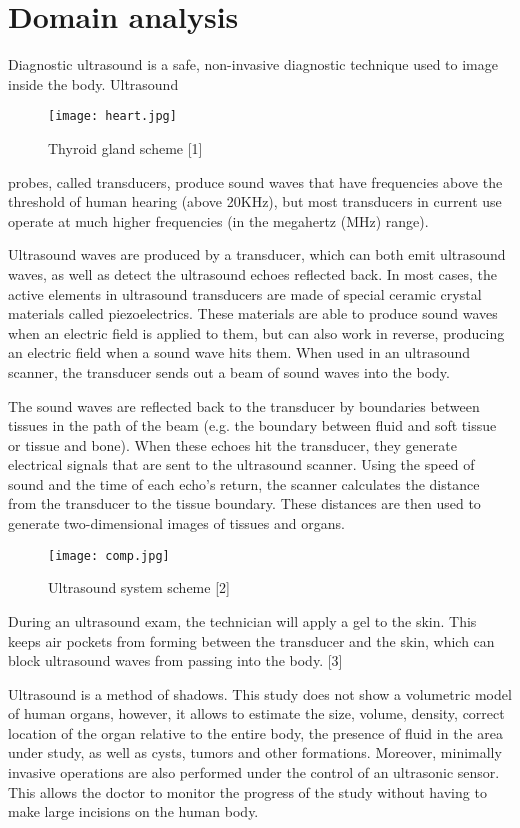 \documentclass[10pt, twocolumn, a4paper]{article}
\begin{document}
\section{Domain analysis}
Diagnostic ultrasound is a safe, non-invasive diagnostic technique used to image inside the body. Ultrasound
\begin{figure}[h!]
    \centering
    \texttt{[image: heart.jpg]}
    \caption{Thyroid gland scheme [1]}
    \label{fig:figure1}
\end{figure}
probes, called transducers, produce sound waves that have frequencies above the threshold of human hearing (above 20KHz), but most transducers in current use operate at much higher frequencies (in the megahertz (MHz) range).

Ultrasound waves are produced by a transducer, which can both emit ultrasound waves, as well as detect the ultrasound echoes reflected back. In most cases, the active elements in ultrasound transducers are made of special ceramic crystal materials called piezoelectrics. These materials are able to produce sound waves when an electric field is applied to them, but can also work in reverse, producing an electric field when a sound wave hits them. When used in an ultrasound scanner, the transducer sends out a beam of sound waves into the body.

The sound waves are reflected back to the transducer by boundaries between tissues in the path of the beam (e.g. the boundary between fluid and soft tissue or tissue and bone). When these echoes hit the transducer, they generate electrical signals that are sent to the ultrasound scanner. Using the speed of sound and the time of each echo’s return, the scanner calculates the distance from the transducer to the tissue boundary. These distances are then used to generate two-dimensional images of tissues and organs.

\begin{figure}[h!]
    \centering
    \texttt{[image: comp.jpg]}
    \caption{Ultrasound system scheme [2]}
    \label{fig:figure2}
\end{figure}

During an ultrasound exam, the technician will apply a gel to the skin. This keeps air pockets from forming between the transducer and the skin, which can block ultrasound waves from passing into the body. [3]

Ultrasound is a method of shadows. This study does not show a volumetric model of human organs, however, it allows to estimate the size, volume, density, correct location of the organ relative to the entire body, the presence of fluid in the area under study, as well as cysts, tumors and other formations. Moreover, minimally invasive operations are also performed under the control of an ultrasonic sensor. This allows the doctor to monitor the progress of the study without having to make large incisions on the human body.
\end{document}
